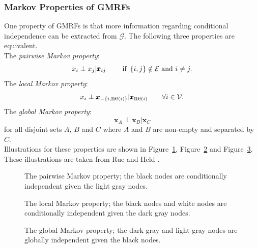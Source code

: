 \subsubsection{Markov Properties of GMRFs}
One property of GMRFs is that more information regarding conditional independence can be extracted from $\mathcal{G}$. The following three properties are equivalent. \\
The \textit{pairwise Markov property}:
\begin{equation*}
    x_i\perp x_j|\pmb{x}_{ij}\hspace{20pt}\hbox{ if }\left\lbrace i,j\right\rbrace\notin\mathcal{E}\hbox{ and }i\neq j.
\end{equation*}
The \textit{local Markov property}:
\begin{equation*}
    x_i\perp \pmb{x}_{-\left\lbrace i, \hbox{ne}\left(i\right)\right\rbrace}|\pmb{x}_{\hbox{ne}\left(i\right)}\hspace{20pt}\forall i\in\mathcal{V}.
\end{equation*}
The \textit{global Markov property}:
\begin{equation*}
    \pmb{x}_{A}\perp \pmb{x}_{B}|\pmb{x}_{C}
\end{equation*}
for all disjoint sets $A$, $B$ and $C$ where $A$ and $B$ are non-empty and separated by $C$. \\ Illustrations for these properties are shown in Figure~\ref{fig:pairwise}, Figure~\ref{fig:local} and Figure~\ref{fig:global}. These illustrations are taken from Rue and Held \autocite[][23--24]{rue2005gaussian}.
\begin{figure}[H]
    \centering
    \caption{The pairwise Markov property; the black nodes are conditionally independent given the light gray nodes.}
    \label{fig:pairwise}
\end{figure}
\begin{figure}[H]
    \centering
    \caption{The local Markov property; the black nodes and white nodes are conditionally independent given the dark gray nodes.}
    \label{fig:local}
\end{figure}
\begin{figure}[H]
    \centering
    \caption{The global Markov property; the dark gray and light gray nodes are globally independent given the black nodes.}
    \label{fig:global}
\end{figure}
